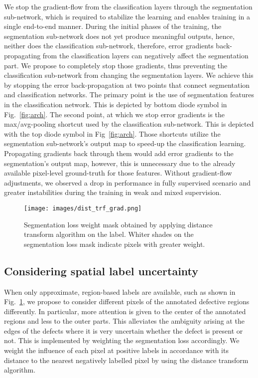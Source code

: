 We stop the gradient-flow from the classification layers through the segmentation sub-network, which is required to stabilize the learning and enables training in a single end-to-end manner. During the initial phases of the training, the segmentation sub-network does not yet produce meaningful outputs, hence, neither does the classification sub-network, therefore, error gradients back-propagating from the classification layers can negatively affect the segmentation part. We propose to completely stop those gradients, thus preventing the classification sub-network from changing the segmentation layers. We achieve this by stopping the error back-propagation at two points that connect segmentation and classification networks. The primary point is the use of segmentation features in the classification network. This is depicted by bottom diode symbol in Fig.~\ref{fig:arch}. The second point, at which we stop error gradients is the max/avg-pooling shortcut used by the classification sub-network. This is depicted with the top diode symbol in Fig~\ref{fig:arch}. Those shortcuts utilize the segmentation sub-network's output map to speed-up the classification learning. Propagating gradients back through them would add error gradients to the segmentation's output map, however, this is unnecessary due to the already available pixel-level ground-truth for those features. Without gradient-flow adjustments, we observed a drop in performance in fully supervised scenario and greater instabilities during the training in weak and mixed supervision.

\begin{figure}%
    \begin{center}
        \texttt{[image: images/dist\_trf\_grad.png]}
    \end{center}
    \caption{Segmentation loss weight mask obtained by applying distance transform algorithm on the label. Whiter shades on the segmentation loss mask indicate pixels with greater weight.} 
  \label{fig:seg_loss_mask}
\end{figure}
\subsection{Considering spatial label uncertainty}

When only approximate, region-based labels are available, such as shown in Fig.~\ref{fig:seg_loss_mask}, we propose to consider different pixels of the annotated defective regions differently. In particular, more attention is given to the center of the annotated regions and less to the outer parts. This alleviates the ambiguity arising at the edges of the defects where it is very uncertain whether the defect is present or not. This is implemented by weighting the segmentation loss accordingly. We weight the influence of each pixel at positive labels in accordance with its distance to the nearest negatively labelled pixel by using the distance transform algorithm. 

